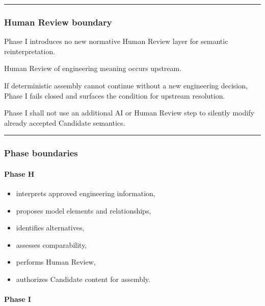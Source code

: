 \begin{center}\rule{0.5\linewidth}{0.5pt}\end{center}

\hypertarget{human-review-boundary}{%
\subsubsection{Human Review boundary}\label{human-review-boundary}}

Phase I introduces no new normative Human Review layer for semantic reinterpretation.

Human Review of engineering meaning occurs upstream.

If deterministic assembly cannot continue without a new engineering decision, Phase I fails closed and surfaces the condition for upstream resolution.

Phase I shall not use an additional AI or Human Review step to silently modify already accepted Candidate semantics.

\begin{center}\rule{0.5\linewidth}{0.5pt}\end{center}

\hypertarget{phase-boundaries}{%
\subsubsection{Phase boundaries}\label{phase-boundaries}}

\hypertarget{phase-h}{%
\paragraph{Phase H}\label{phase-h}}

\begin{itemize}
\tightlist
\item
  interprets approved engineering information,
\item
  proposes model elements and relationships,
\item
  identifies alternatives,
\item
  assesses comparability,
\item
  performs Human Review,
\item
  authorizes Candidate content for assembly.
\end{itemize}

\hypertarget{phase-i}{%
\paragraph{Phase I}\label{phase-i}}

